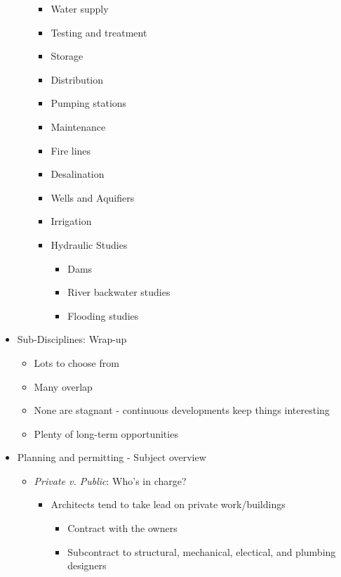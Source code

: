 \documentclass{article}
\begin{document}
\begin{itemize}
\begin{itemize}
        \begin{itemize}
            \item Water supply
            \item Testing and treatment
            \item Storage
            \item Distribution
            \item Pumping stations
            \item Maintenance
            \item Fire lines
            \item Desalination
            \item Wells and Aquifiers
            \item Irrigation
            \item Hydraulic Studies
            \begin{itemize}
                \item Dams
                \item River backwater studies
                \item Flooding studies
            \end{itemize}
        \end{itemize}
    \end{itemize}
    \item Sub-Disciplines: Wrap-up
    \begin{itemize}
        \item Lots to choose from
        \item Many overlap
        \item None are stagnant - continuous developments keep things interesting
        \item Plenty of long-term opportunities
    \end{itemize}
    \item Planning and permitting - Subject overview
    \begin{itemize}
        \item \textit{Private v. Public}: Who's in charge?
        \begin{itemize}
            \item Architects tend to take lead on private work/buildings
            \begin{itemize}
                \item Contract with the owners
                \item Subcontract to structural, mechanical, electical, and plumbing designers

\end{itemize}
\end{itemize}
\end{itemize}
\end{itemize}
\end{document}
